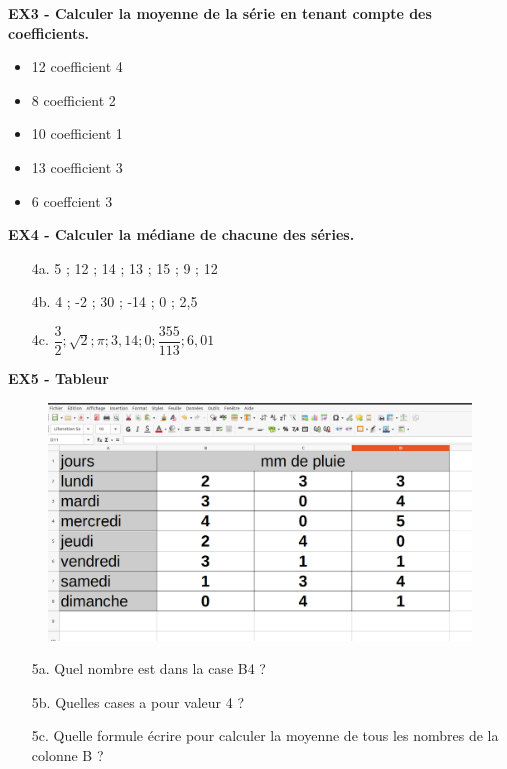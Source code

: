 \textbf{EX3 - Calculer la moyenne de la série en tenant compte des coefficients.}

\begin{minipage}[t]{0.2\textwidth}
  \begin{itemize}[label={$\bullet$}]
    \item 12 coefficient 4
    \item 8 coefficient 2
    \item 10 coefficient 1
    \item 13 coefficient 3
    \item 6 coeffcient 3 
  \end{itemize}
\end{minipage}
\begin{minipage}[t]{0.8\textwidth}
  \Pointilles[6]
\end{minipage}

\textbf{EX4 - Calculer la médiane de chacune des séries.}

\begin{multicols}{3}

\begin{enumerate}
  \item[4a.] 5 ; 12 ; 14 ; 13 ; 15 ; 9 ; 12 \\ \Pointilles[5]
  \item[4b.] 4 ; -2  ; 30 ; -14 ; 0 ; 2,5 \\ \Pointilles[5]
  \item[4c.] $\dfrac{3}{2} ; \sqrt{2} ; \pi ; 3,14 ; 0 ; \dfrac{355}{113} ; 6,01$ \\ \Pointilles[5]
\end{enumerate}

\end{multicols}

\newpage

\textbf{EX5 - Tableur}

\begin{figure}[H]
  \centering
  \includegraphics[width=0.5\linewidth]{4x8-statistiques/tab.png}
\end{figure}

\begin{enumerate}
  \item[5a.] Quel nombre est dans la case B4 ? \dotfill
  \item[5b.] Quelles cases a pour valeur 4 ? \dotfill
  \item[5c.] Quelle formule écrire pour calculer la moyenne de tous les nombres de la colonne B ?  \\ \Pointilles[1]
\end{enumerate}


